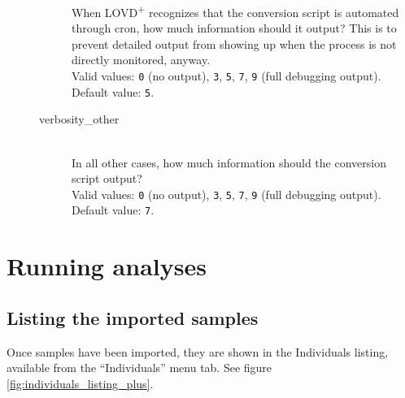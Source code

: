 \begin{description}
\begin{description}
      When LOVD\textsuperscript{+} recognizes that the conversion script is automated through cron,
       how much information should it output?
      This is to prevent detailed output from showing up when the process is not directly monitored, anyway.\\
      Valid values: \texttt{0} (no output), \texttt{3}, \texttt{5}, \texttt{7}, \texttt{9} (full debugging output).\\
      Default value: \texttt{5}.
    \item[verbosity\_other] \hfill \\
      In all other cases, how much information should the conversion script output?\\
      Valid values: \texttt{0} (no output), \texttt{3}, \texttt{5}, \texttt{7}, \texttt{9} (full debugging output).\\
      Default value: \texttt{7}.
  \end{description}
\end{description}










\chapter{Running analyses}
\label{chap:running_analyses}
\section{Listing the imported samples}
\label{sec:running_analyses_data_listing}

Once samples have been imported, they are shown in the Individuals listing,
 available from the ``Individuals'' menu tab.
See figure \ref{fig:individuals_listing_plus}.

